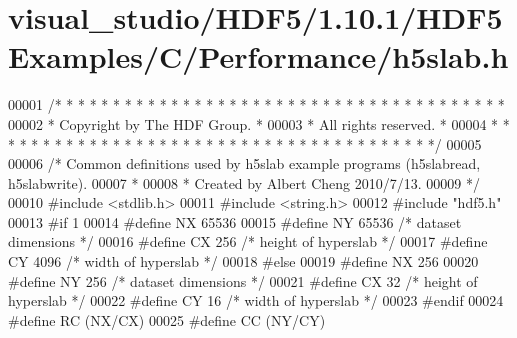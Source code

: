 \hypertarget{visual__studio_2_h_d_f5_21_810_81_2_h_d_f5_examples_2_c_2_performance_2h5slab_8h_source}{}\section{visual\+\_\+studio/\+H\+D\+F5/1.10.1/\+H\+D\+F5\+Examples/\+C/\+Performance/h5slab.h}
\label{visual__studio_2_h_d_f5_21_810_81_2_h_d_f5_examples_2_c_2_performance_2h5slab_8h_source}

\begin{DoxyCode}
00001 \textcolor{comment}{/* * * * * * * * * * * * * * * * * * * * * * * * * * * * * * * * * * * * * * *}
00002 \textcolor{comment}{ * Copyright by The HDF Group.                                               *}
00003 \textcolor{comment}{ * All rights reserved.                                                      *}
00004 \textcolor{comment}{ * * * * * * * * * * * * * * * * * * * * * * * * * * * * * * * * * * * * * * */}
00005 
00006 \textcolor{comment}{/* Common definitions used by h5slab example programs (h5slabread, h5slabwrite).}
00007 \textcolor{comment}{ *}
00008 \textcolor{comment}{ * Created by Albert Cheng 2010/7/13.}
00009 \textcolor{comment}{ */}
00010 \textcolor{preprocessor}{#include <stdlib.h>}
00011 \textcolor{preprocessor}{#include <string.h>}
00012 \textcolor{preprocessor}{#include "hdf5.h"}
00013 \textcolor{preprocessor}{#if 1}
00014 \textcolor{preprocessor}{#define NX    65536  }
00015 \textcolor{preprocessor}{#define NY    65536       }\textcolor{comment}{/* dataset dimensions */}\textcolor{preprocessor}{}
00016 \textcolor{preprocessor}{#define CX    256        }\textcolor{comment}{/* height of hyperslab */}\textcolor{preprocessor}{}
00017 \textcolor{preprocessor}{#define CY    4096        }\textcolor{comment}{/* width of hyperslab */}\textcolor{preprocessor}{}
00018 \textcolor{preprocessor}{#else}
00019 \textcolor{preprocessor}{#define NX    256  }
00020 \textcolor{preprocessor}{#define NY    256       }\textcolor{comment}{/* dataset dimensions */}\textcolor{preprocessor}{}
00021 \textcolor{preprocessor}{#define CX    32        }\textcolor{comment}{/* height of hyperslab */}\textcolor{preprocessor}{}
00022 \textcolor{preprocessor}{#define CY    16        }\textcolor{comment}{/* width of hyperslab */}\textcolor{preprocessor}{}
00023 \textcolor{preprocessor}{#endif}
00024 \textcolor{preprocessor}{#define RC    (NX/CX)}
00025 \textcolor{preprocessor}{#define CC    (NY/CY)}
\end{DoxyCode}
